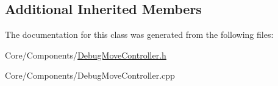 \subsection*{Additional Inherited Members}


The documentation for this class was generated from the following files\-:\begin{DoxyCompactItemize}
\item 
Core/\-Components/\hyperlink{DebugMoveController_8h}{Debug\-Move\-Controller.\-h}\item 
Core/\-Components/Debug\-Move\-Controller.\-cpp\end{DoxyCompactItemize}
